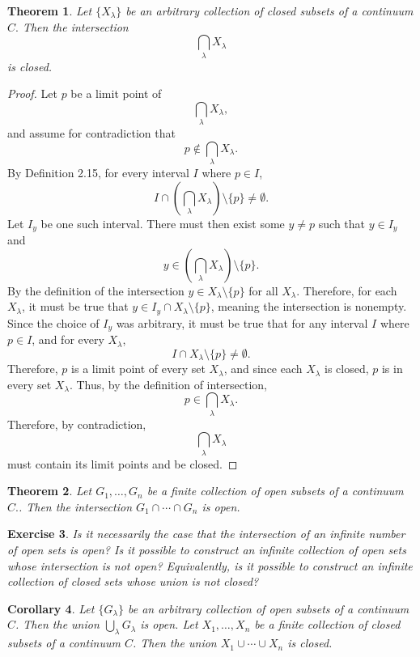 \documentclass{amsart}
\newtheorem{theorem}{Theorem}
\newtheorem{corollary}[theorem]{Corollary}
\newtheorem{exercise}[theorem]{Exercise}
\newcommand{\1}{\mathds{1}}
\numberwithin{equation}{section}
\numberwithin{theorem}{section}
\begin{document}
\begin{theorem}  Let $\{X_{\lambda} \}$ be an arbitrary collection of closed subsets of a continuum $C.$  Then the intersection
\[
	\bigcap_{\lambda} X_{\lambda}
\]
is closed.
\end{theorem}

\begin{proof}
	Let $p$ be a limit point of $$\bigcap_{\lambda} X_{\lambda},$$ and assume for contradiction that $$p\notin \bigcap_{\lambda} X_{\lambda}.$$ By Definition 2.15, for every interval $I$ where $p\in I$, $$I \cap \left( \bigcap_{\lambda} X_{\lambda} \right) \setminus \{p\} \not= \emptyset.$$ Let $I_y$ be one such interval. There must then exist some $y\not=p$ such that $y\in I_y$ and $$y\in \left( \bigcap_{\lambda} X_{\lambda} \right) \setminus \{p\}.$$ By the definition of the intersection $y\in X_{\lambda}\setminus \{p\}$ for all $X_{\lambda}$. Therefore, for each $X_{\lambda}$, it must be true that $y\in I_y \cap X_{\lambda}\setminus \{p\}$, meaning the intersection is nonempty. Since the choice of $I_y$ was arbitrary, it must be true that for any interval $I$ where $p\in I$, and for every $X_{\lambda}$, $$I \cap X_{\lambda}\setminus \{p\} \not= \emptyset.$$ Therefore, $p$ is a limit point of every set $X_{\lambda}$, and since each $X_{\lambda}$ is closed, $p$ is in every set $X_{\lambda}$. Thus, by the definition of intersection, $$p\in \bigcap_{\lambda} X_{\lambda}.$$ Therefore, by contradiction, $$\bigcap_{\lambda} X_{\lambda}$$ must contain its limit points and be closed.
\end{proof}

\begin{theorem} \label{*} Let $G_1, \dotsc, G_n$ be a finite collection of open subsets of a continuum $C.$.  Then the intersection $G_1 \cap \dotsm \cap G_n$ is open.
\end{theorem}


\begin{exercise}  Is it necessarily the case that the intersection of an infinite number of open sets is open? Is it possible to construct an infinite collection of open sets whose intersection is not open?  Equivalently, is it possible to construct an infinite collection of closed sets whose union is not closed?
\end{exercise} 

\begin{corollary}\label{fortop2}  Let $\{G_{\lambda} \}$ be an arbitrary collection of open subsets of a continuum $C$.  Then the union $\bigcup_{\lambda} G_{\lambda}$ is open.  Let $X_1, \dotsc, X_n$ be a finite collection of closed subsets of a continuum $C$.  Then the union $X_1 \cup \dotsm \cup X_n$ is closed.
\end{corollary}
\end{document}
